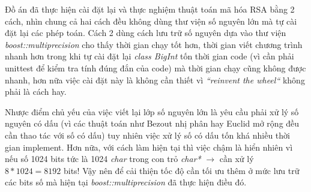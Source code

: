 Đồ án đã thực hiện cài đặt lại và thực nghiệm thuật toán mã hóa RSA bằng 2 cách, nhìn chung cả hai cách đều không dùng thư viện số nguyên lớn mà tự cài đặt lại các phép toán. 
Cách 2 dùng cách lưu trữ số nguyên dựa vào thư viện \textit{boost::multiprecision} cho thấy thời gian chạy tốt hơn, thời gian viết chương trình nhanh hơn trong 
khi tự cài đặt lại \textit{class BigInt} tốn thời gian code (vì cần phải unittest để kiểm tra tính đúng đắn của code) mà thời gian chạy cũng không được nhanh, hơn 
nữa việc cài đặt này là không cần thiết vì \textit{``reinvent the wheel``} không phải là cách hay.

Nhược điểm chủ yếu của việc viết lại lớp số nguyên lớn là yêu cầu phải xử lý số nguyên có dấu (vì các thuật toán như Bezout nhị phân hay Euclid mở rộng đều cần thao tác với số có dấu) tuy nhiên việc xử lý số có dấu tốn khá nhiều thời gian implement. Hơn nữa, với cách làm hiện tại thì việc chậm là hiển nhiên vì nếu số 1024 bits tức là 1024 \textit{char} trong con trỏ \textit{char*} $\rightarrow$ cần xử lý $8*1024 = 8192$ bits! Vậy nên để cải thiện tốc độ cần tối ưu thêm ở mức lưu trữ các bits số mà hiện tại \textit{boost::multiprecision} đã thực hiện điều đó.

